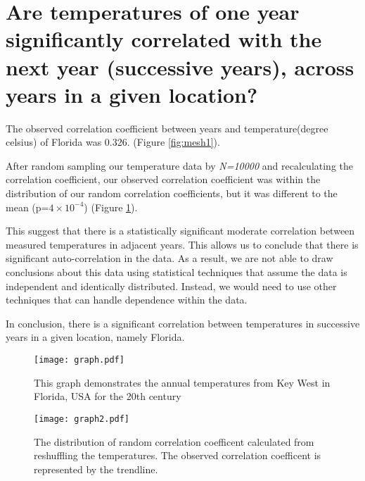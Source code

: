 \documentclass[12pt]{article}
\begin{document}
\section*{\large \centering Are temperatures of one year significantly correlated with the next year 
(successive years), across years in a given location?}


The observed correlation coefficient between years and temperature(degree celsius) of Florida was
0.326. (Figure \ref{fig:mesh1}).

After random sampling our temperature data by \textit{N=10000} and recalculating the correlation coefficient,
our observed correlation coefficient was within the distribution of our random correlation
coefficients, but it was different to the mean (p=$4\times10^{-4}$) (Figure \ref{fig:mesh2}).

This suggest that there is a 
statistically significant moderate correlation between measured temperatures in adjacent years. This
allows us to conclude that there is significant auto-correlation in the data. As a result, we are
not able to draw conclusions about this data using statistical techniques that assume the data is
independent and identically distributed. Instead, we would need to use other techniques that can
handle dependence within the data.

In conclusion, there is a significant correlation between temperatures in successive years in a
given location, namely Florida.


\begin{figure}[H]
  \begin{minipage}{.45\textwidth}
        \texttt{[image: graph.pdf]}
        \centering
        \caption{This graph demonstrates the annual temperatures from Key West in Florida, USA for the 20th century}
        \label{fig:mesh1}
  \end{minipage}%
  \begin{minipage}{.5\textwidth}
        \texttt{[image: graph2.pdf]}
        \centering
        \caption{The distribution of random correlation coefficent calculated from reshuffling the temperatures. The observed correlation coefficent is represented by the trendline.}
        \label{fig:mesh2}
  \end{minipage}
\end{figure}
\end{document}
